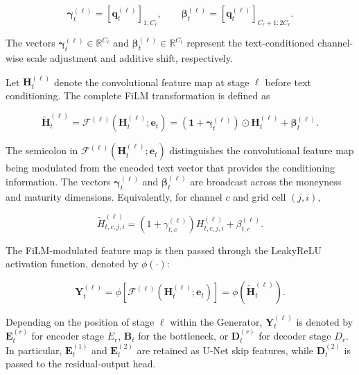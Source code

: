 \begin{equation}\label{eq:ch3:film_parameter_split}
\boldsymbol{\gamma}^{(\ell)}_t
=
\left[
\mathbf{q}^{(\ell)}_t
\right]_{1:C_\ell},
\qquad
\boldsymbol{\beta}^{(\ell)}_t
=
\left[
\mathbf{q}^{(\ell)}_t
\right]_{C_\ell+1:2C_\ell}.
\end{equation}

The vectors
$\boldsymbol{\gamma}^{(\ell)}_t\in\mathbb{R}^{C_\ell}$ and
$\boldsymbol{\beta}^{(\ell)}_t\in\mathbb{R}^{C_\ell}$ represent the
text-conditioned channel-wise scale adjustment and additive shift,
respectively.

Let $\mathbf{H}^{(\ell)}_t$ denote the convolutional feature map at stage
$\ell$ before text conditioning. The complete FiLM transformation is defined
as

\begin{equation}\label{eq:ch3:film_transformation}
\widetilde{\mathbf{H}}^{(\ell)}_t
=
\mathcal{F}^{(\ell)}
\left(
\mathbf{H}^{(\ell)}_t;
\mathbf{e}_t
\right)
=
\left(
\mathbf{1}
+
\boldsymbol{\gamma}^{(\ell)}_t
\right)
\odot
\mathbf{H}^{(\ell)}_t
+
\boldsymbol{\beta}^{(\ell)}_t.
\end{equation}

The semicolon in $\mathcal{F}^{(\ell)}(\mathbf{H}^{(\ell)}_t;\mathbf{e}_t)$
distinguishes the convolutional feature map being modulated from the encoded
text vector that provides the conditioning information. The vectors
$\boldsymbol{\gamma}^{(\ell)}_t$ and $\boldsymbol{\beta}^{(\ell)}_t$ are broadcast across the moneyness and maturity dimensions. Equivalently, for channel $c$ and grid cell $(j,i)$,

\begin{equation}\label{eq:ch3:film_transformation_element}
\widetilde{H}^{(\ell)}_{t,c,j,i}
=
\left(
1+\gamma^{(\ell)}_{t,c}
\right)
H^{(\ell)}_{t,c,j,i}
+
\beta^{(\ell)}_{t,c}.
\end{equation}

The FiLM-modulated feature map is then passed through the LeakyReLU activation
function, denoted by $\phi(\cdot)$:

\begin{equation}\label{eq:ch3:film_activation}
\mathbf{Y}^{(\ell)}_t
=
\phi\left[
\mathcal{F}^{(\ell)}
\left(
\mathbf{H}^{(\ell)}_t;
\mathbf{e}_t
\right)
\right]
=
\phi\left(
\widetilde{\mathbf{H}}^{(\ell)}_t
\right).
\end{equation}

Depending on the position of stage $\ell$ within the Generator,
$\mathbf{Y}^{(\ell)}_t$ is denoted by
$\mathbf{E}^{(r)}_t$ for encoder stage $E_r$,
$\mathbf{B}_t$ for the bottleneck, or
$\mathbf{D}^{(r)}_t$ for decoder stage $D_r$. In particular,
$\mathbf{E}^{(1)}_t$ and $\mathbf{E}^{(2)}_t$ are retained as U-Net skip
features, while $\mathbf{D}^{(2)}_t$ is passed to the residual-output head.

